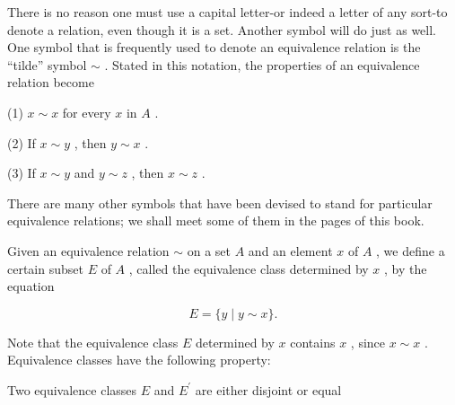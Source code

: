 There is no reason one must use a capital letter-or indeed a letter of any sort-to denote a relation, even though it is a set. Another symbol will do just as well. One symbol that is frequently used to denote an equivalence relation is the ``tilde'' symbol \(\sim\) . Stated in this notation, the properties of an equivalence relation become

(1) \(x \sim  x\) for every \(x\) in \(A\) .

(2) If \(x \sim  y\) , then \(y \sim  x\) .

(3) If \(x \sim  y\) and \(y \sim  z\) , then \(x \sim  z\) .

There are many other symbols that have been devised to stand for particular equivalence relations; we shall meet some of them in the pages of this book.

Given an equivalence relation \(\sim\) on a set \(A\) and an element \(x\) of \(A\) , we define a certain subset \(E\) of \(A\) , called the equivalence class determined by \(x\) , by the equation

\[
E = \{ y \mid  y \sim  x\} .
\]

Note that the equivalence class \(E\) determined by \(x\) contains \(x\) , since \(x \sim  x\) . Equivalence classes have the following property:

\begin{lemma} Two equivalence classes \(E\) and \({E}^{\prime }\) are either disjoint or equal
\end{lemma}

